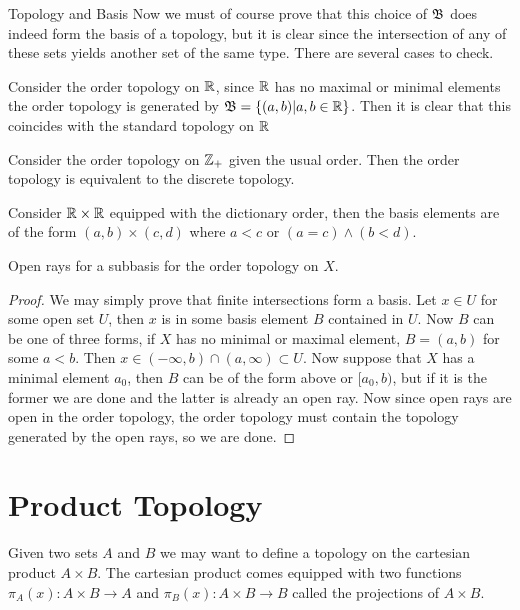 \begin{chapter}{Topology and Basis}
    Now we must of course prove that this choice of $\mathfrak{B}$ does indeed form the basis of a topology, but it is clear since 
    the intersection of any of these sets yields another set of the same type. There are several cases to check. 
    
    \begin{ex}
        Consider the order topology on $\mathbb{R}$, since $\mathbb{R}$ has no maximal or minimal elements the order topology is generated by 
        $\mathfrak{B} = \{(a, b) | a, b \in \mathbb{R}\}$. Then it is clear that this coincides with the standard topology on $\mathbb{R}$
    \end{ex}

    
    \begin{ex}
        Consider the order topology on $\mathbb{Z}_{+}$ given the usual order. Then the order topology is equivalent to the discrete topology. 
    \end{ex}

    
    \begin{ex}
        Consider $\mathbb{R} \times \mathbb{R}$ equipped with the dictionary order, then the basis elements are of the form 
        $(a, b) \times (c, d)$ where $a < c$ or $(a = c) \wedge (b < d)$. 
    \end{ex}

    \begin{thm}
        Open rays for a subbasis for the order topology on $X$. 
    \end{thm}

    \begin{proof}
        We may simply prove that finite intersections form a basis. Let $x \in U$ for some open set $U$, then $x$ is in some basis element $B$ contained in $U$. 
        Now $B$ can be one of three forms, if $X$ has no minimal or maximal element, $B = (a, b)$ for some $a < b$. Then $x \in (-\infty, b) \cap (a , \infty) \subset U$. 
        Now suppose that $X$ has a minimal element $a_0$, then $B$ can be of the form above or $[a_0, b)$, but if it is the former we are done and the latter is already an open ray. 
        Now since open rays are open in the order topology, the order topology must contain the topology generated by the open rays, so we are done. 
    \end{proof}

    \section{Product Topology}
        Given two sets $A$ and $B$ we may want to define a topology on the cartesian product $A \times B$. 
    The cartesian product comes equipped with two functions $\pi_A(x): A \times B \to A$ and $\pi_B(x): A \times B \to B$ called 
    the projections of $A \times B$. 


\end{chapter}
